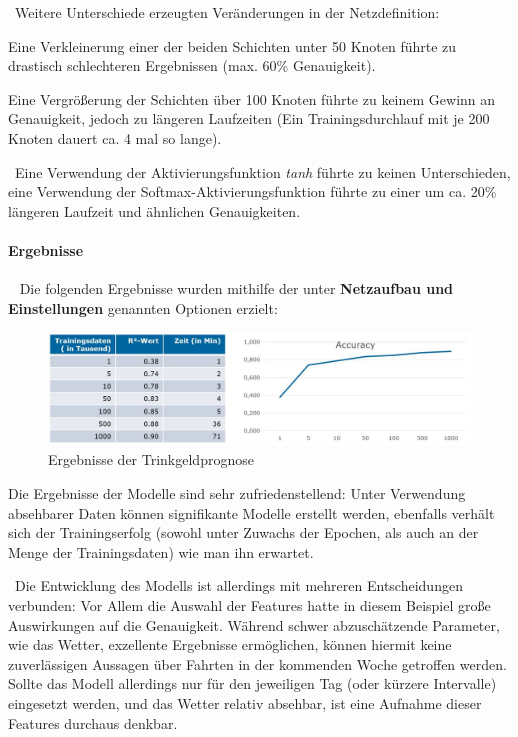 ~\newline Weitere Unterschiede erzeugten Veränderungen in der Netzdefinition: 

Eine Verkleinerung einer der beiden Schichten unter 50 Knoten führte zu drastisch schlechteren Ergebnissen (max. 60\% Genauigkeit). 

Eine Vergrößerung der Schichten über 100 Knoten führte zu keinem Gewinn an Genauigkeit, jedoch zu längeren Laufzeiten (Ein Trainingsdurchlauf mit je 200 Knoten dauert ca. 4 mal so lange).

~\newline Eine Verwendung der Aktivierungsfunktion \textit{tanh} führte zu keinen Unterschieden, eine Verwendung der Softmax-Aktivierungsfunktion führte zu einer um ca. 20\% längeren Laufzeit und ähnlichen Genauigkeiten. 
\paragraph{Ergebnisse} ~\newline
Die folgenden Ergebnisse wurden mithilfe der unter \textbf{Netzaufbau und Einstellungen} genannten Optionen erzielt:

\begin{figure}[h]
	\begin{center}
		\includegraphics[width=0.95\linewidth]{Bilder/TrinkgeldErgebnisse}
		\caption[Ergebnisse der Trinkgeldprognose]{Ergebnisse der Trinkgeldprognose}
		\label{fig:TipErg}
	\end{center}
\end{figure}

Die Ergebnisse der Modelle sind sehr zufriedenstellend: Unter Verwendung absehbarer Daten können signifikante Modelle erstellt werden, ebenfalls verhält sich der Trainingserfolg (sowohl unter Zuwachs der Epochen, als auch an der Menge der Trainingsdaten) wie man ihn erwartet. 

~\newline Die Entwicklung des Modells ist allerdings mit mehreren Entscheidungen verbunden: Vor Allem die Auswahl der Features hatte in diesem Beispiel große Auswirkungen auf die Genauigkeit. Während schwer abzuschätzende Parameter, wie das Wetter, exzellente Ergebnisse ermöglichen, können hiermit keine zuverlässigen Aussagen über Fahrten in der kommenden Woche getroffen werden. Sollte das Modell allerdings nur für den jeweiligen Tag (oder kürzere Intervalle) eingesetzt werden, und das Wetter relativ absehbar, ist eine Aufnahme dieser Features durchaus denkbar. 

